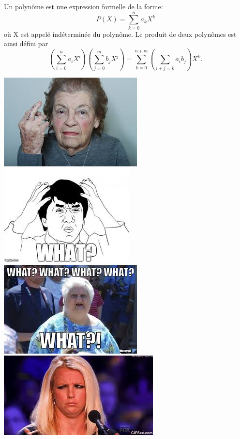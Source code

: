 \documentclass{42}
\begin{document}
\begin{flushleft}
Un polynôme est une expression formelle de la forme:
	\begin{equation}
	P(X)=\sum_{k=0}^{n} a_k X^k
	\end{equation}
	où X est appelé indéterminée du polynôme.
	\newline
	\newline
	Le produit de deux polynômes est ainsi défini par
	\begin{equation}
	\left(\sum_{i=0}^n a_iX^i\right)\left(\sum_{j=0}^m b_jX^j\right) = \sum_{k=0}^{n+m} \left(\sum_{i+j = k}a_ib_j\right)X^k.
	\end{equation}
\end{flushleft}
\begin{center}
	\includegraphics[scale=0.35]{what1}
	\includegraphics[scale=0.35]{what2}
	\includegraphics[scale=0.35]{what3}
	\includegraphics[scale=0.35]{what4}

\end{center}
\end{document}
